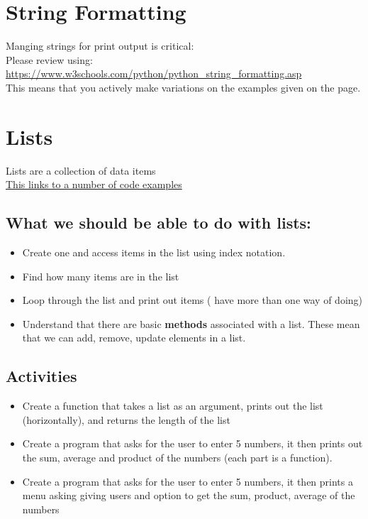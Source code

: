 \documentclass[a4paper,12pt]{article}
\begin{document}
\section{String Formatting}
Manging strings for print output is critical:\\

Please review using:\\
\url{https://www.w3schools.com/python/python_string_formatting.asp}\\
This means that you actively make variations on the examples given on the page. 
\section{Lists}
Lists are a collection of data items\\
\hyperlink{Lists}{This links to a number of code examples}
\subsection{What we should be able to do with lists:}
\begin{itemize}
	\item Create one and access items in the list using index notation.
	\item Find how many items are in the list
	\item Loop through the list and print out items ( have more than one way of doing)
	\item Understand that there are basic \textbf{methods} associated with a list. These mean that we can add, remove, update elements in a list.
\end{itemize}
\subsection{Activities}
\begin{itemize}
	\item Create a function that takes a list as an argument, prints out the list (horizontally), and returns the length of the list
	\item Create a program that asks for the user to enter 5 numbers, it then prints out the sum, average  and product of the numbers (each part is a function).
	\item Create a program that asks for the user to enter 5 numbers, it then prints a menu asking giving users and option to get the sum, product, average of the numbers
\end{itemize}
\end{document}
